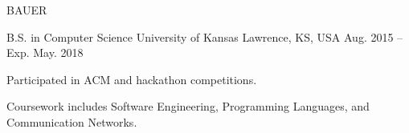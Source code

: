 \documentclass[11pt]{resume}
\begin{document}
\makecvheader[C]

\makecvfooter
  {BAUER}
  {\thepage}
  {\pageref{LastPage}}




\begin{cventries}
  \cventry
    {B.S. in Computer Science}
    {University of Kansas}
    {Lawrence, KS, USA}
    {Aug. 2015 – Exp. May. 2018}
    {
      \begin{cvitems}
      \item {
          Participated in ACM and hackathon competitions.
        }
      \item { Coursework includes Software Engineering, Programming Languages,
          and Communication Networks. }
      \end{cvitems}
    }

\end{cventries}

\end{document}
